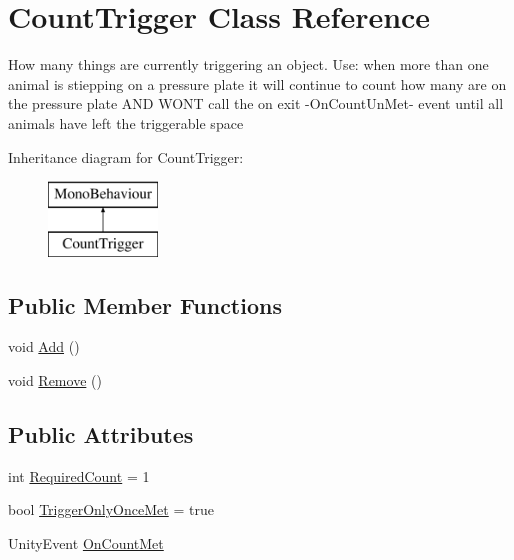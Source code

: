 \hypertarget{class_count_trigger}{}\section{Count\+Trigger Class Reference}
\label{class_count_trigger}


How many things are currently triggering an object. Use\+: when more than one animal is stiepping on a pressure plate it will continue to count how many are on the pressure plate A\+ND W\+O\+NT call the on exit -\/\+On\+Count\+Un\+Met-\/ event until all animals have left the triggerable space  


Inheritance diagram for Count\+Trigger\+:\begin{figure}[H]
\begin{center}
\leavevmode
\includegraphics[height=2.000000cm]{class_count_trigger}
\end{center}
\end{figure}
\subsection*{Public Member Functions}
\begin{DoxyCompactItemize}
\item 
void \mbox{\hyperlink{class_count_trigger_a7ac7751ad41acdb8eddf93f30ab25b73}{Add}} ()
\item 
void \mbox{\hyperlink{class_count_trigger_a2bf18805d9afcd8a686fbad7ddb86a3a}{Remove}} ()
\end{DoxyCompactItemize}
\subsection*{Public Attributes}
\begin{DoxyCompactItemize}
\item 
int \mbox{\hyperlink{class_count_trigger_a84809838e4a7ce1f4e4ab8631ad00e37}{Required\+Count}} = 1
\item 
bool \mbox{\hyperlink{class_count_trigger_a4e29714cf7b88cca2c0806286eb0e26e}{Trigger\+Only\+Once\+Met}} = true
\item 
Unity\+Event \mbox{\hyperlink{class_count_trigger_ad0d5ce3d95e858b575ffc5252ac78c2d}{On\+Count\+Met}}
\end{DoxyCompactItemize}


